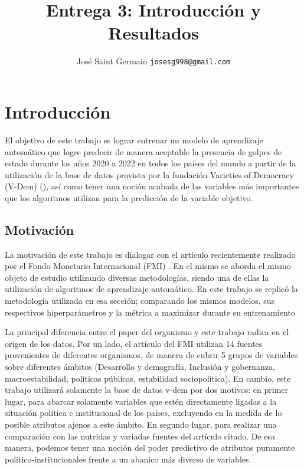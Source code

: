 \documentclass{article}
\title{Entrega 3: Introducción y Resultados}
\author{José Saint Germain \texttt{josesg998@gmail.com} }
\begin{document}
\maketitle

\pagebreak
\tableofcontents
\pagebreak

\section{Introducción}



El objetivo de este trabajo es lograr entrenar un modelo de aprendizaje automático
que logre predecir de manera aceptable la presencia de golpes de estado durante los años 
2020 a 2022 en todos los países del mundo a partir de la utilización de la base de datos 
provista por la fundación Varieties of Democracy (V-Dem) (\cite{Cop24}), 
así como tener una noción acabada de las variables más importantes que los algoritmos 
utilizan para la predicción de la variable objetivo.

\subsection{Motivación}
La motivación de este trabajo es dialogar con el artículo recientemente realizado por el 
Fondo Monetario Internacional (FMI) \cite{Ceb24}. En el mismo se aborda el mismo objeto 
de estudio utilizando diversas metodologías, siendo una de ellas la utilización de 
algoritmos de aprendizaje automático. En este trabajo se replicó la metodología utilizada 
en esa sección; comparando los mismos modelos, sus respectivos hiperparámetros y la 
métrica a maximizar durante su entrenamiento

La principal diferencia entre el paper del organismo y este trabajo radica en el origen
de los datos. Por un lado, el artículo del FMI utilizan 14 fuentes provenientes de 
diferentes organismos, de manera de cubrir 5 grupos de variables sobre diferentes ámbitos 
(Desarrollo y demografía, Inclusión y gobernanza, macroestabilidad, políticas públicas, 
estabilidad sociopolítica). En cambio, este trabajo utilizará solamente la base de datos 
v-dem por dos motivos: en primer lugar, para abarcar solamente variables que estén 
directamente ligadas a la situación política e institucional de los países, excluyendo en 
la medida de lo posible atributos ajenos a este ámbito. En segundo lugar, para realizar 
una comparación con las nutridas y variadas fuentes del artículo citado. De esa manera, 
podemos tener una noción del poder predictivo de atributos puramente 
político-institucionales frente a un abanico más diverso de variables.
\end{document}
